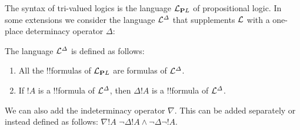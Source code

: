 \documentclass[../../../include/open-logic-section]{subfiles}
\begin{document}


The syntax of tri-valued logics is the language $\Lang L_{\Log PL}$ of propositional logic. In some extensions we consider the language $\Lang L^{\Delta}$ that supplements $\Lang L$ with a one-place determinacy operator $\Delta$:

\begin{defn}
The language $\Lang L^{\Delta}$ is defined as follows:

\begin{enumerate}
  \item All the !!{formula}s of $\Lang L_{\Log PL}$ are formulas of $\Lang L^{\Delta}$.
  \item If $!A$ is a !!{formula} of $\Lang L^{\Delta}$, then $\Delta !A$ is a !!{formula} of $\Lang L^{\Delta}$.
\end{enumerate}

\end{defn}

We can also add the indeterminacy operator $\nabla$. This can be added separately or instead defined as follows: $\nabla !A$ $\lnot \Delta !A \land \lnot \Delta \lnot !A$. 
\end{document}
